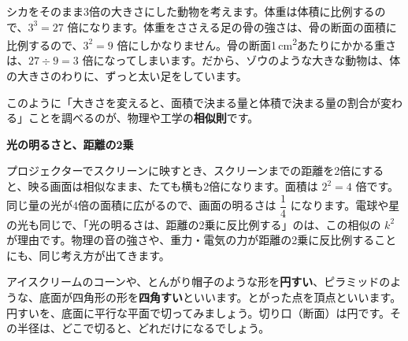\par{}
\noindent\begin{minipage}[c]{0.62\linewidth}
シカをそのまま3倍の大きさにした動物を考えます。体重は体積に比例するので、$3^3=27$ 倍になります。体重をささえる足の骨の強さは、骨の断面の面積に比例するので、$3^2=9$ 倍にしかなりません。骨の断面1\,\unit{cm^2}あたりにかかる重さは、$27\div9=3$ 倍になってしまいます。だから、ゾウのような大きな動物は、体の大きさのわりに、ずっと太い足をしています。

このように「大きさを変えると、面積で決まる量と体積で決まる量の割合が変わる」ことを調べるのが、物理や工学の\textbf{相似則}です。
\end{minipage}\hfill
\begin{minipage}[c]{0.34\linewidth}\centering
{}
\end{minipage}

\begin{motto}[3]
\textbf{光の明るさと、距離の2乗}\par
プロジェクターでスクリーンに映すとき、スクリーンまでの距離を2倍にすると、映る画面は相似なまま、たても横も2倍になります。面積は $2^2=4$ 倍です。同じ量の光が4倍の面積に広がるので、画面の明るさは $\dfrac{1}{4}$ になります。電球や星の光も同じで、「光の明るさは、距離の2乗に反比例する」のは、この相似の $k^2$ が理由です。物理の音の強さや、重力・電気の力が距離の2乗に反比例することにも、同じ考え方が出てきます。
\end{motto}


\leavevmode\label{bk:4-3:sui}アイスクリームのコーンや、とんがり帽子のような形を\textbf{円すい}、ピラミッドのような、底面が四角形の形を\textbf{四角すい}といいます。とがった点を頂点といいます。円すいを、底面に平行な平面で切ってみましょう。切り口（断面）は円です。その半径は、どこで切ると、どれだけになるでしょう。

